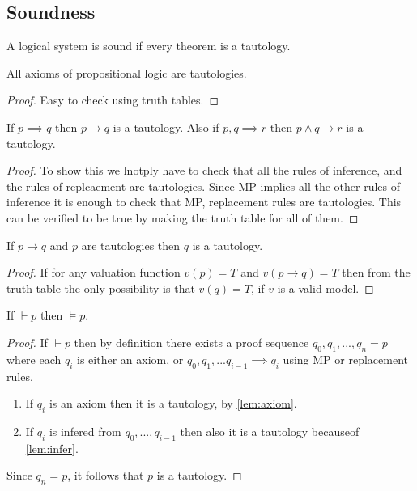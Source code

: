 \subsection{Soundness}
\begin{definition}
  A logical system is sound if every theorem is a tautology.
\end{definition}
\begin{lemma}
  All axioms of propositional logic are tautologies.
\end{lemma}
\begin{proof}
  Easy to check using truth tables.
\end{proof}
\begin{lemma}\label{lem:axiom}
  If $p \implies q$ then $p \to q$ is a tautology. Also if $p, q \implies r$ then $p\land q \to r$ is a tautology.
\end{lemma}
\begin{proof}
  To show this we lnotply have to check that all the rules of inference, and the rules of replcaement are tautologies. Since MP implies all the other rules of inference it is enough to check that MP, replacement rules are tautologies. This can be verified to be true by making the truth table for all of them.
\end{proof}
\begin{lemma}\label{lem:infer}
  If $p\to q$ and $p$ are tautologies then $q$ is a tautology.
\end{lemma}
\begin{proof}
  If for any valuation function $v(p) = T$ and $v(p\to q) = T$ then from the truth table the only possibility is that $v(q) = T$, if $v$ is a valid model. 
\end{proof}
\begin{theorem}[Soundness]
  If $\vdash p$ then $\vDash p$.
\end{theorem}
\begin{proof}
  If $\vdash p$ then by definition there exists a proof sequence $q_0,q_1,...,q_n = p$ where each $q_i$ is either an axiom, or $q_0,q_1,...q_{i-1}\implies q_i$ using MP or replacement rules.
  \begin{enumerate}
    \item If $q_i$ is an axiom then it is a tautology, by \cref{lem:axiom}.
    \item If $q_i$ is infered from $q_0,...,q_{i-1}$ then also it is a tautology becauseof \cref{lem:infer}.
  \end{enumerate}
  Since $q_n = p$, it follows that $p$ is a tautology.
\end{proof}
